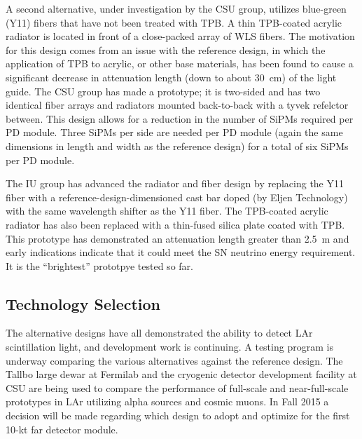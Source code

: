 A second alternative, under investigation by the CSU group, utilizes
blue-green (Y11) fibers that have not been treated with TPB. A thin 
TPB-coated acrylic radiator is located in front of a close-packed array of
WLS fibers. The motivation for this design comes from %
an issue
with the reference design, in which the application of TPB to acrylic, or
other base materials, has been found to cause a significant decrease in attenuation
length (down to about 30~cm) of the light guide.  %
The CSU group has made a prototype; it is two-sided and has two identical fiber arrays and radiators mounted back-to-back
with a tyvek refelctor between. %
This design allows for a reduction in the
number of SiPMs required per PD module. Three SiPMs per side are
needed per PD module (again the same dimensions in length and width as
the reference design) for a total of six SiPMs per PD module.

The IU group has advanced the radiator and fiber design  by replacing
the Y11 fiber with a reference-design-dimensioned cast bar doped (by
Eljen Technology) with the same wavelength shifter as the Y11
fiber. The TPB-coated acrylic radiator has also been replaced with a
thin-fused silica plate coated with TPB. This prototype has
demonstrated an attenuation length greater than 2.5~m and early
indications %
indicate that it could meet the SN neutrino energy
requirement. It is the ``brightest'' prototpye tested so far.

\subsection{Technology Selection}

The alternative designs have all  demonstrated the ability to detect
LAr scintillation light, and development work is continuing. A testing program
is underway comparing the various alternatives against the reference
design.  The Tallbo large dewar at Fermilab and the cryogenic detector
development facility at CSU are being used to compare the performance
of full-scale and near-full-scale prototypes in LAr utilizing alpha
sources and cosmic muons. %
 In Fall 2015 a decision will be made regarding which design to adopt and optimize for the first 10-kt far detector module.

